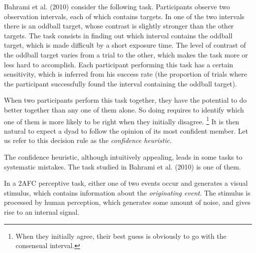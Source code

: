 \documentclass[12pt]{report}
\begin{document}




Bahrami et al. (2010) consider the following task. Participants observe two observation intervals, each of which contains targets. In one of the two intervals there is an oddball target, whose contrast is slightly stronger than the other targets. The task consists in finding out which interval contains the oddball target, which is made difficult by a short exposure time. The level of contrast of the oddball target varies from a trial to the other, which makes the task more or less hard to accomplish. Each participant performing this task has a certain sensitivity, which is inferred from his success rate (the proportion of trials where the participant successfully found the interval containing the oddball target).

When two participants perform this task together, they have the potential to do better together than any one of them alone. So doing requires to identify which one of them is more likely to be right when they initially disagree. \footnote{When they initially agree, their best guess is obviously to go with the consensual interval.} It is then natural to expect a dyad to follow the opinion of its most confident member. Let us refer to this decision rule as the \textit{confidence heuristic}.

The confidence heuristic, although intuitively appealing, leads in some tasks to systematic mistakes. The task studied in Bahrami et al. (2010) is one of them. 

In a 2AFC perceptive task, either one of two events occur and generates a visual stimulus, which contains information about the \textit{originating event}. The stimulus is processed by human perception, which generates some amount of noise, and gives rise to an internal signal.
\end{document}
